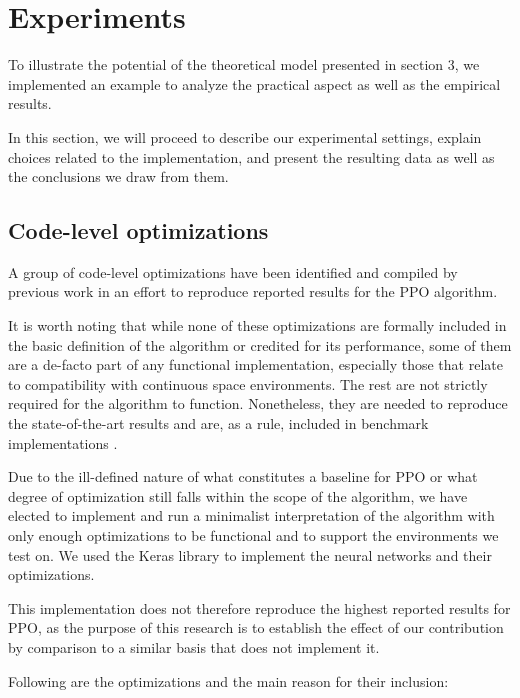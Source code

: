 \section{Experiments}
\label{sec:exp}
	To illustrate the potential of the theoretical model presented in section 3, we implemented an example to analyze the practical aspect as well as the empirical results.

In this section, we will proceed to describe our experimental settings, explain choices related to the implementation, and present the resulting data as well as the conclusions we draw from them.

\subsection{Code-level optimizations}

A group of code-level optimizations have been identified and compiled by previous work \cite{engstrom2020implementation}\cite{shengyi2022the37implementation} in an effort to reproduce reported results for the PPO algorithm. 

It is worth  noting that while none of these optimizations are formally included in the basic definition of the algorithm or credited for its performance, some of them are a de-facto part of any functional implementation, especially those that relate to compatibility with  continuous space environments. The rest are not strictly required for the algorithm to function. Nonetheless, they are needed to reproduce the state-of-the-art results and are, as a rule, included in benchmark implementations \cite{huang2021cleanrl} \cite{baselines}. %

Due to the ill-defined nature of what constitutes a baseline for PPO or what degree of optimization still falls within the scope of the algorithm, we have elected to implement and run a minimalist interpretation of the algorithm with only enough optimizations to be functional and to support the environments we test on. We used the Keras library to implement the neural networks and their optimizations.

This implementation does not therefore reproduce the highest reported results for PPO, as the purpose of this research is to establish the effect of our contribution by comparison to a similar basis that does not implement it.

Following are the optimizations and the main reason for their inclusion:


